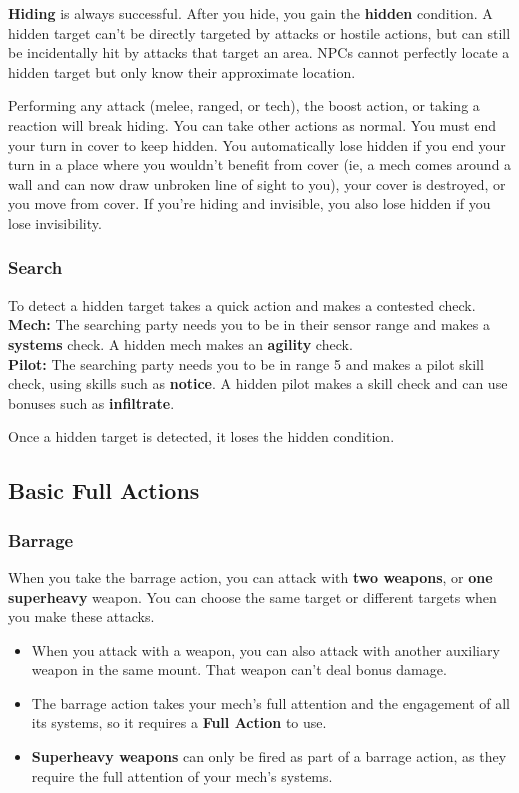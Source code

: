 \textbf{Hiding} is always successful. After you hide, you gain the \textbf{hidden} condition. A hidden target can’t be directly targeted by attacks or hostile actions, but can still be incidentally hit by attacks that target an area. NPCs cannot perfectly locate a hidden target but only know their approximate location. 

Performing any attack (melee, ranged, or tech), the boost action, or taking a reaction will break hiding. You can take other actions as normal. You must end your turn in cover to keep hidden. You automatically lose hidden if you end your turn in a place where you wouldn’t benefit from cover (ie, a mech comes around a wall and can now draw unbroken line of sight to you), your cover is destroyed, or you move from cover. If you’re hiding and invisible, you also lose hidden if you lose invisibility.


\subsubsection{Search}

To detect a hidden target takes a quick action and makes a contested check.\\
\qquad\textbf{Mech:} The searching party needs you to be in their sensor range and makes a \textbf{systems} check. A hidden mech makes an \textbf{agility} check.\\
\qquad\textbf{Pilot:} The searching party needs you to be in range 5 and makes a pilot skill check, using skills such as \textbf{notice}. A hidden pilot makes a skill check and can use bonuses such as \textbf{infiltrate}.

Once a hidden target is detected, it loses the hidden condition.


\subsection{Basic Full Actions}
\subsubsection{Barrage}

When you take the barrage action, you can attack with \textbf{two weapons}, or \textbf{one superheavy} weapon. You can choose the same target or different targets when you make these attacks.
\begin{itemize}
    \item When you attack with a weapon, you can also attack with another auxiliary weapon in the same mount. That weapon can’t deal bonus damage.
    \item The barrage action takes your mech’s full attention and the engagement of all its systems, so it requires a \textbf{Full Action} to use. 
    \item \textbf{Superheavy weapons} can only be fired as part of a barrage action, as they require the full attention of your mech’s systems.
\end{itemize}

